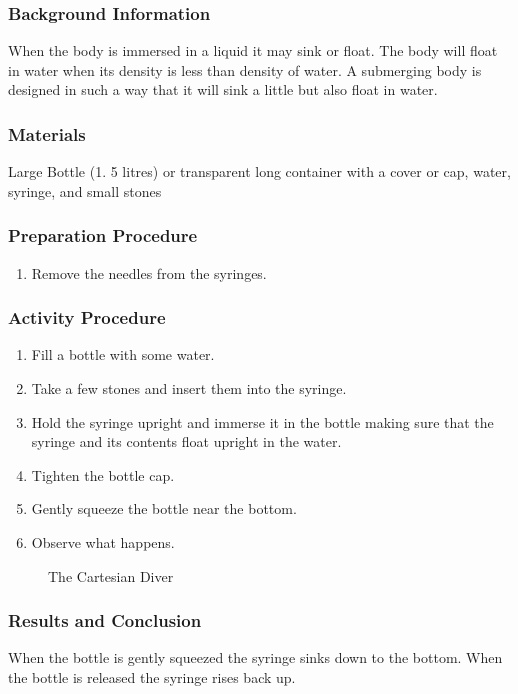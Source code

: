 \subsubsection*{Background Information}
When the body is immersed in a liquid it may sink or float. The body will float in water when its density is less than density of water. A submerging body is designed in such a way that it will sink a little but also float in water. 

\subsubsection*{Materials}
Large Bottle (1. 5 litres) or transparent long container with a cover or cap, water, syringe, and small stones

\subsubsection*{Preparation Procedure}
\begin{enumerate}
\item{Remove the needles from the syringes.}
\end{enumerate}

\subsubsection*{Activity Procedure}
\begin{enumerate}
\item{Fill a bottle with some water.}
\item{Take a few stones and insert them into the syringe.}
\item{Hold the syringe upright and immerse it in the bottle making sure that the syringe and its contents float upright in the water.}
\item{Tighten the bottle cap.}
\item{Gently squeeze the bottle near the bottom.} 
\item{Observe what happens.}
\end{enumerate}

\begin{figure}
\begin{center}
\def\svgwidth{150pt}

\caption{The Cartesian Diver}
\label{fig:cartesian-diver}
\end{center}
\end{figure}

\subsubsection*{Results and Conclusion}
When the bottle is gently squeezed the syringe sinks down to the bottom. When the bottle is released the syringe rises back up. 

